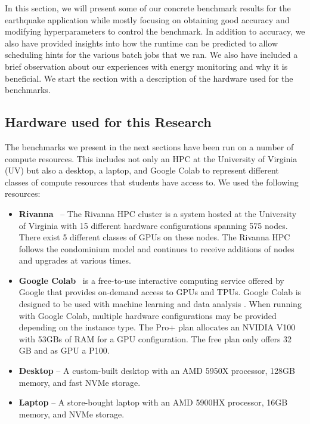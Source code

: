 \documentclass[utf8]{FrontiersinVancouver} %
\begin{document}
In this section, we will present some of our concrete benchmark results for the earthquake application while mostly focusing on obtaining good accuracy and modifying hyperparameters to control the benchmark. In addition to accuracy, we also have provided insights into how the runtime can be predicted to allow scheduling hints for the various batch jobs that we ran. We also have included a brief observation about our experiences with energy monitoring and why it is beneficial. We start the section with a description of the hardware used for the benchmarks.


\subsection{Hardware used for this Research}

The benchmarks we present in the next sections have been run on a number of compute resources. This includes not only an HPC at the University of Virginia (UV) but also a desktop, a laptop, and Google Colab to represent different classes of compute resources that students have access to. We used the following resources:

\begin{itemize}
\item {\bf Rivanna}~\citep{www-rivanna} -- The Rivanna HPC cluster is a system hosted at the University of Virginia
with 15 different hardware configurations spanning 575 nodes. 
There exist 5 different classes of GPUs on these nodes. The Rivanna HPC follows the condominium model and continues to receive additions of nodes and upgrades at various times.
\item {\bf Google Colab}~\cite{google-colab} is a free-to-use interactive computing service offered by Google that provides on-demand access to GPUs and TPUs. Google Colab is designed to be used with machine learning and data analysis \cite{google-colab}.
When running with Google Colab, multiple hardware configurations may be provided depending on the instance type. The Pro+ plan allocates an NVIDIA V100 with 53GBs of RAM for a GPU configuration. The free plan only offers 32 GB and as GPU a P100.
\item {\bf Desktop} -- A custom-built desktop with an AMD 5950X processor, 128GB memory, and fast NVMe storage.
\item {\bf Laptop} -- A store-bought laptop with an AMD 5900HX processor, 16GB memory, and NVMe storage.

\end{itemize}
\end{document}

